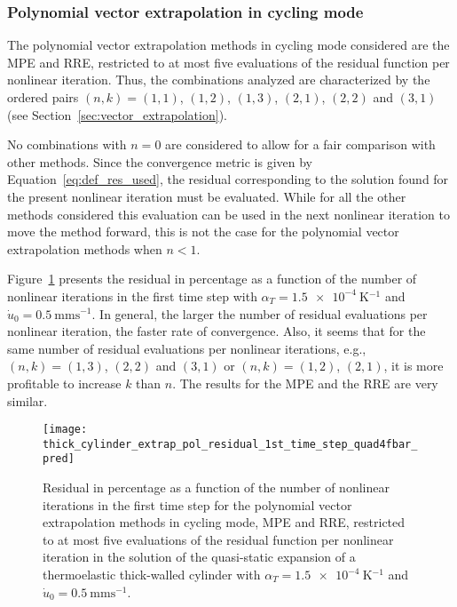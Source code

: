 \FloatBarrier

\subsubsection{Polynomial vector extrapolation in cycling mode}

The polynomial vector extrapolation methods in cycling mode considered are the MPE and RRE, restricted to at most five evaluations of the residual function per nonlinear iteration.
Thus, the combinations analyzed are characterized by the ordered pairs \((n,k)=(1,1)\), \((1,2)\), \((1,3)\), \((2,1)\), \((2,2)\) and \((3,1)\) (see Section~\ref{sec:vector_extrapolation}).

No combinations with \(n=0\) are considered to allow for a fair comparison with other methods.
Since the convergence metric is given by Equation~\eqref{eq:def_res_used}, the residual corresponding to the solution found for the present nonlinear iteration must be evaluated.
While for all the other methods considered this evaluation can be used in the next nonlinear iteration to move the method forward, this is not the case for the polynomial vector extrapolation methods when \(n<1\).

Figure~\ref{fig:thick_cylinder_extrap_pol_residual_1st_time_step_quad4fbar_pred} presents the residual in percentage as a function of the number of nonlinear iterations in the first time step with \(\alpha_T=\SI{1.5e-4}{\kelvin^{-1}}\) and \(\dot u_0 =\SI{0.5}{\milli\meter\second^{-1}}\).
In general, the larger the number of residual evaluations per nonlinear iteration, the faster rate of convergence.
Also, it seems that for the same number of residual evaluations per nonlinear iterations, e.g., \((n,k)=(1,3)\), \((2,2)\) and \((3,1)\) or \((n,k)=(1,2)\), \((2,1)\), it is more profitable to increase \(k\) than \(n\).
The results for the MPE and the RRE are very similar.

\begin{figure}[htbp]
 \centering
 \texttt{[image: thick\_cylinder\_extrap\_pol\_residual\_1st\_time\_step\_quad4fbar\_pred]}
 \caption{Residual in percentage as a function of the number of nonlinear iterations in the first time step for the polynomial vector extrapolation methods in cycling mode, MPE and RRE, restricted to at most five evaluations of the residual function per nonlinear iteration in the solution of the quasi-static expansion of a thermoelastic thick-walled cylinder with \(\alpha_T=\SI{1.5e-4}{\kelvin^{-1}}\) and \(\dot u_0 =\SI{0.5}{\milli\meter\second^{-1}}\).}
\label{fig:thick_cylinder_extrap_pol_residual_1st_time_step_quad4fbar_pred}
\end{figure}


